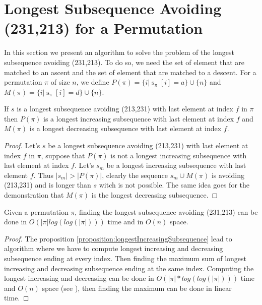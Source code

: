 \documentclass[a4paper]{llncs}
\newcommand{\ptext}{\pi}
\DeclareMathOperator{\stripea}{s}
\newcommand{\stripe}[2]{\stripea_{{#1}}[{#2}]}
\newcounter{num}
\newcommand{\dstep}{d}
\newcommand{\ustep}{a}
\begin{document}

\section{Longest Subsequence Avoiding \\(231,213) for a Permutation}
\label{section:LCS}

	In this section we present an algorithm to solve the problem
	of the longest subsequence avoiding (231,213).
	To do so, we need the set of element
	that are matched to an ascent and the
	set of element that are matched to a descent.
	For a permutation $\pi$ of size $n$, we define
	$P(\pi) = \{i | \stripe{\pi}{i} = \ustep \} \cup \{n\}$ and  
	$M(\pi) = \{i | \stripe{\pi}{i} = \dstep \} \cup \{n\}$.\\
	
	\begin{proposition}
	\label{proposition:longestIncreasingSubsequence}
	If $s$ is a longest subsequence avoiding (213,231) with last element at index $f$ in $\pi$ then
	$P(\pi)$ is a longest increasing subsequence with last element at index $f$ and
	$M(\pi)$ is a longest decreasing subsequence with last element at index $f$.	
	\end{proposition}
	
	\begin{proof}
	Let's $s$ be a longest subsequence avoiding (213,231) with last element at index $f$ in $\pi$, 
	suppose that $P(\pi)$ is not a longest increasing subsequence with last element at index $f$. Let's $s_m$ be a longest increasing subsequence with last element $f$.
	Thus $|s_m|>|P(\pi)|$, clearly the sequence $s_m \cup M(\pi)$
	is avoiding (213,231) and is longer than $s$ witch is not possible. 
	The same idea goes for the demonstration that $M(\pi)$ is the longest decreasing subsequence.
	\end{proof}

	\begin{proposition}
	Given a permutation $\pi$, 
	finding the longest subsequence avoiding (231,213)
	can be done in $O(|\ptext|log(log(|\ptext|)))$ time and in $O(n)$ space.	
	\end{proposition}
	
	\begin{proof}
	The proposition \ref{proposition:longestIncreasingSubsequence} lead to algorithm 
	where we have to compute longest increasing and decreasing subsequence ending at every index. Then finding the maximum sum of longest increasing and decreasing subsequence ending at the same index.
	Computing the longest increasing and decreasing can be done in $O(|\ptext|*log(log(|\ptext|)))$ time and $O(n)$ space (see \cite{Bespamyatnikh00enumeratinglongest}), then finding the maximum can be done in linear time.
	\end{proof}
\end{document}
